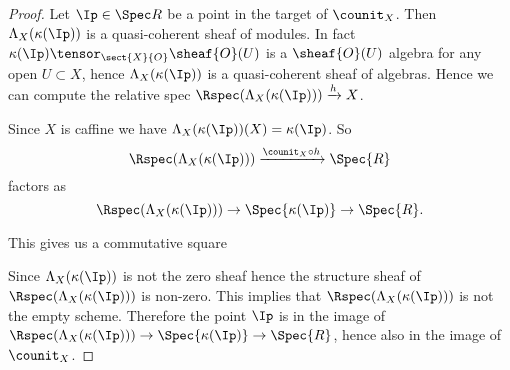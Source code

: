 \begin{proof}
Let $\Ip\in \Spec R$ be a point in the target of $\counit_X$.
Then $\Lambda_X(\kappa(\Ip))$ is a quasi-coherent sheaf of modules.
In fact $\kappa(\Ip)\tensor_{\sect{X}{O}} \sheaf{O}(U)$ is a $\sheaf{O}(U)$ algebra 
for any open $U\subset X$, hence $\Lambda_X(\kappa(\Ip))$ is a quasi-coherent sheaf of algebras.
Hence we can compute the relative spec $\Rspec(\Lambda_X(\kappa(\Ip)))\xrightarrow{h} X$. 

Since $X$ is caffine we have $\Lambda_X(\kappa(\Ip))(X) = \kappa(\Ip)$.
So \[\Rspec(\Lambda_X(\kappa(\Ip)))\xrightarrow{\counit_X \circ h} \Spec{R}\]
factors as \[\Rspec(\Lambda_X(\kappa(\Ip)))\rightarrow \Spec{\kappa(\Ip)} \rightarrow \Spec{R}.\]

This gives us a commutative square

\begin{center}
\end{center}

Since $\Lambda_X(\kappa(\Ip))$ is not the zero sheaf hence the structure sheaf of $\Rspec(\Lambda_X(\kappa(\Ip)))$ is non-zero.
This implies that $\Rspec(\Lambda_X(\kappa(\Ip)))$ is not the empty scheme. 
Therefore the point $\Ip$ is in the image of $\Rspec(\Lambda_X(\kappa(\Ip)))\rightarrow \Spec{\kappa(\Ip)} \rightarrow \Spec{R}$,
hence also in the image of $\counit_X$.
\end{proof}